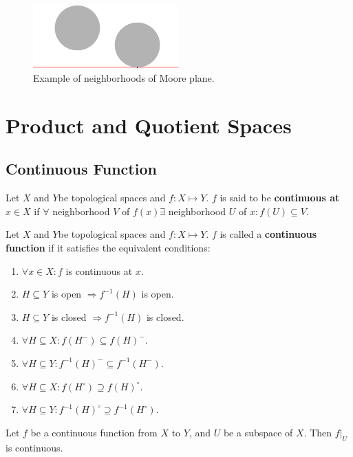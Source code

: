 \documentclass[12pt]{book}
\begin{document}
\begin{figure}[htb!]
	\centering  
	\includegraphics[width=0.5\textwidth ]{resources/chap_topo_spc/moore.pdf}  
	\caption{Example of neighborhoods of Moore plane.}
	\label{fig:moore}
\end{figure}

\chapter{Product and Quotient Spaces}
\section{Continuous Function}

\begin{definition}
	Let $X$ and $Y$be topological spaces and $f:X\mapsto Y$. $f$ is said to be {\bf continuous at} $x\in X$ if $\forall$ neighborhood $V$ of $f(x)\exists$ neighborhood $U$ of $x:f(U)\subseteq V$.
\end{definition}

\begin{definition}
	Let $X$ and $Y$be topological spaces and $f:X\mapsto Y$. $f$ is called a {\bf continuous function} if it satisfies the equivalent conditions:
	\begin{enumerate}
		\item $\forall x\in X:f$ is continuous at $x$.
		\item $H\subseteq Y$ is open $\Rightarrow f^{-1}(H)$ is open.
		\item $H\subseteq Y$ is closed $\Rightarrow f^{-1}(H)$ is closed.
		\item $\forall H\subseteq X: f(H^-)\subseteq f(H)^-$.
		\item $\forall H\subseteq Y: f^{-1}(H)^-\subseteq f^{-1}(H^-)$.
		\item $\forall H\subseteq X: f(H^\circ)\supseteq f(H)^\circ$.
		\item $\forall H\subseteq Y: f^{-1}(H)^\circ\supseteq f^{-1}(H^\circ)$.
	\end{enumerate}
\end{definition}

\begin{theorem}
	Let $f$ be a continuous function from $X$ to $Y$, and $U$ be a subspace of $X$. Then $f|_U$ is continuous.
\end{theorem}
\end{document}
